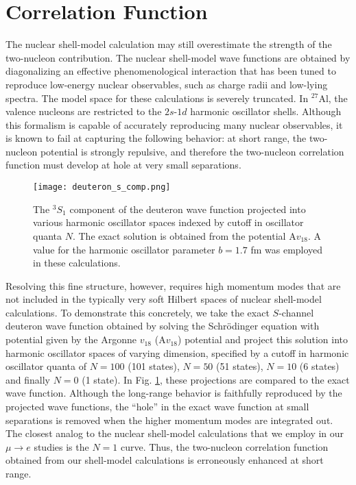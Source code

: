 \documentclass{book}[letterpaper,12pt]
\begin{document}
\section{Correlation Function}
\label{sec:cor_fun}
The nuclear shell-model calculation may still overestimate the strength of the two-nucleon contribution. The nuclear shell-model wave functions are obtained by diagonalizing an effective phenomenological interaction that has been tuned to reproduce low-energy nuclear observables, such as charge radii and low-lying spectra. The model space for these calculations is severely truncated. In $^{27}$Al, the valence nucleons are restricted to the $2s$-$1d$ harmonic oscillator shells. Although this formalism is capable of accurately reproducing many nuclear observables, it is known to fail at capturing the following behavior: at short range, the two-nucleon potential is strongly repulsive, and therefore the two-nucleon correlation function must develop at hole at very small separations.

\begin{figure}
\centering
\texttt{[image: deuteron\_s\_comp.png]}
\caption{The $^3S_1$ component of the deuteron wave function projected into various harmonic oscillator spaces indexed by cutoff in oscillator quanta $N$. The exact solution is obtained from the potential A$v_{18}$. A value for the harmonic oscillator parameter $b=1.7$ fm was employed in these calculations.}
\label{fig:deuteron_proj}
\end{figure}

Resolving this fine structure, however, requires high momentum modes that are not included in the typically very soft Hilbert spaces of nuclear shell-model calculations. To demonstrate this concretely, we take the exact $S$-channel deuteron wave function obtained by solving the Schr\"odinger equation with potential given by the Argonne $v_{18}$ (A$v_{18}$) potential\cite{PhysRevC.51.38} and project this solution into harmonic oscillator spaces of varying dimension, specified by a cutoff in harmonic oscillator quanta of $N=100$ (101 states), $N=50$ (51 states), $N=10$ (6 states) and finally $N=0$ (1 state). In Fig. \ref{fig:deuteron_proj}, these projections are compared to the exact wave function. Although the long-range behavior is faithfully reproduced by the projected wave functions, the ``hole'' in the exact wave function at small separations is removed when the higher momentum modes are integrated out. The closest analog to the nuclear shell-model calculations that we employ in our $\mu\rightarrow e$ studies is the $N=1$ curve. Thus, the two-nucleon correlation function obtained from our shell-model calculations is erroneously enhanced at short range.
\end{document}
